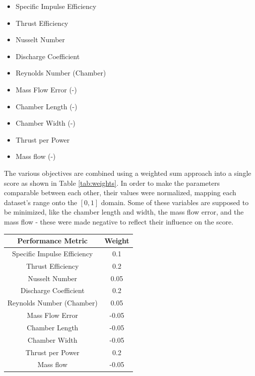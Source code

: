 \documentclass{homework}
\begin{document}
\begin{multicols}{2}
	  \begin{itemize} %
            \item Specific Impulse Efficiency
            \item Thrust Efficiency
            \item Nusselt Number
            \item Discharge Coefficient
            \item Reynolds Number (Chamber)
            \item Mass Flow Error (-)
            \item Chamber Length (-)
            \item Chamber Width (-)
            \item Thrust per Power
            \item Mass flow (-)
        \end{itemize}
    
   The various objectives are combined using a weighted sum approach into a single score as shown in Table \ref{tab:weights}. In order to make the parameters comparable between each other, their values were normalized, mapping each dataset's range onto the $[0,1]$ domain. Some of these variables are supposed to be minimized, like the chamber length and width, the mass flow error, and the mass flow - these were made negative to reflect their influence on the score. 
	    
    \begin{minipage}{\linewidth}
    \centering
    \label{tab:weight_coefficients}
        \begin{tabular}{|c|c|}
            \hline
            \textbf{Performance Metric} & \textbf{Weight} \\
            \hline
            Specific Impulse Efficiency & 0.1 \\
            Thrust Efficiency & 0.2 \\
            Nusselt Number & 0.05 \\
            Discharge Coefficient & 0.2 \\
            Reynolds Number (Chamber) & 0.05 \\
            Mass Flow Error & -0.05 \\
            Chamber Length & -0.05 \\
            Chamber Width & -0.05 \\
            Thrust per Power & 0.2 \\
            Mass flow & -0.05 \\
            \hline
        \end{tabular}
        \label{tab:weights}
    \end{minipage}


\end{multicols}
\end{document}
